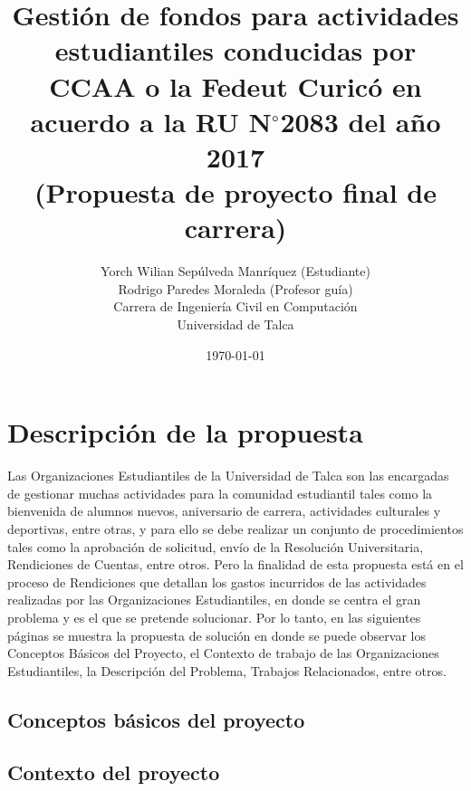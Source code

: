 \documentclass[11pt,letterpaper]{article}
\newcommand{\grad}{$^{\circ}$}
\begin{document}
\pagestyle{empty}

\title{
    Gestión de fondos para actividades estudiantiles conducidas por CCAA o la Fedeut Curicó en acuerdo a la RU N\grad 2083 del año 2017\\
    (Propuesta de proyecto final de carrera)}

\author{
Yorch Wilian Sepúlveda Manríquez (Estudiante)\\
Rodrigo Paredes Moraleda (Profesor guía)\\
Carrera de Ingeniería Civil en Computación\\ 
Universidad de Talca}

\date{\today}

\maketitle


\section{Descripción de la propuesta}

Las Organizaciones Estudiantiles de la Universidad de Talca son las encargadas de gestionar muchas actividades para la comunidad estudiantil tales como la bienvenida de alumnos nuevos, aniversario de carrera, actividades culturales y deportivas, entre otras, y para ello se debe realizar un conjunto de procedimientos tales como la aprobación de solicitud, envío de la Resolución Universitaria, Rendiciones de Cuentas, entre otros. Pero la finalidad de esta propuesta está en el proceso de Rendiciones que detallan los gastos incurridos de las actividades realizadas por las Organizaciones Estudiantiles, en donde se centra el gran problema y es el que se pretende solucionar. Por lo tanto, en las siguientes páginas se muestra la propuesta de solución en donde se puede observar los Conceptos Básicos del Proyecto, el Contexto de trabajo de las Organizaciones Estudiantiles, la Descripción del Problema, Trabajos Relacionados, entre otros.



\subsection{Conceptos básicos del proyecto} 


\subsection{Contexto del proyecto} 

\end{document}
